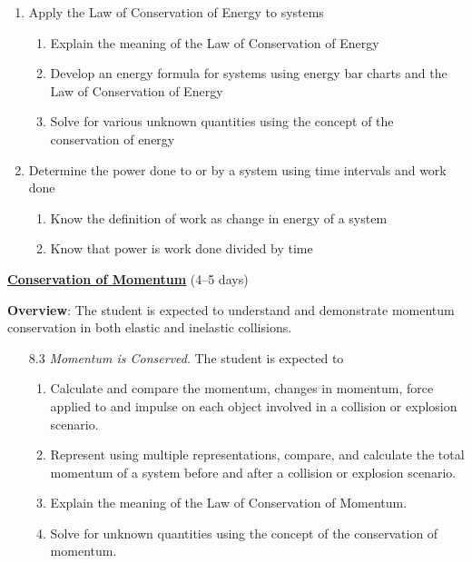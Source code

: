 \documentclass[dvipsnames]{article}
\begin{document}
\begin{enumerate}
\begin{enumerate}
        \item Apply the Law of Conservation of Energy to systems
        \begin{enumerate}
            \item Explain the meaning of the Law of Conservation of Energy
            \item Develop an energy formula for systems using energy bar charts and the Law of Conservation of Energy
            \item Solve for various unknown quantities using the concept of the conservation of energy
        \end{enumerate}
        \item Determine the power done to or by a system using time intervals and work done
        \begin{enumerate}
            \item Know the definition of work as change in energy of a system
            \item Know that power is work done divided by time
        \end{enumerate}
    \end{enumerate}
\end{enumerate}

\textbf{\underline{Conservation of Momentum}} (4--5 days)

\textbf{Overview}: The student is expected to understand and demonstrate momentum conservation in both elastic and inelastic collisions.

\begin{enumerate}
    \item[8.3] \textit{Momentum is Conserved}. The student is expected to
    \begin{enumerate}
        \item Calculate and compare the momentum, changes in momentum, force applied to and impulse on each object involved in a collision or explosion scenario.
        \item Represent using multiple representations, compare, and calculate the total momentum of a system before and after a collision or explosion scenario.
        \item Explain the meaning of the Law of Conservation of Momentum.
        \item Solve for unknown quantities using the concept of the conservation of momentum.
    \end{enumerate}
\end{enumerate}
\end{document}
